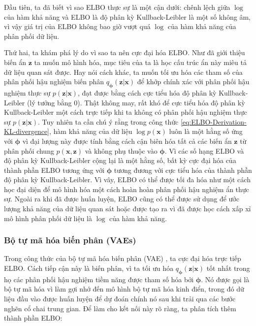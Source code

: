 \documentclass[14pt, a4paper]{article}
\numberwithin{equation}{section}
\numberwithin{figure}{section}
\numberwithin{dl}{section}
\numberwithin{md}{section}
\numberwithin{bd}{section}
\numberwithin{dn}{section}
\numberwithin{hq}{section}
\begin{document}
    Đầu tiên, ta đã biết vì sao ELBO thực sự là một cận dưới: chênh lệch giữa $\log$ của hàm khả năng và ELBO là độ phân kỳ Kullback-Leibler là một số không âm, vì vậy giá trị của ELBO không bao giờ vượt quá $\log$ của hàm khả năng của phân phối dữ liệu.

    Thứ hai, ta khám phá lý do vì sao ta nên cực đại hóa ELBO.
    Như đã giới thiệu biến ẩn $\boldsymbol{z}$ ta muốn mô hình hóa, mục tiêu của ta là học cấu trúc ẩn này miêu tả dữ liệu quan sát được.
    Hay nói cách khác, ta muốn tối ưu hóa các tham số của phân phối hậu nghiệm biến phân $q_{\boldsymbol{\phi}} (\boldsymbol{z} \vert \boldsymbol{x})$ để khớp chính xác với phân phối hậu nghiệm thực sự $p(\boldsymbol{z} \vert \boldsymbol{x})$, đạt được bằng cách cực tiểu hóa độ phân kỳ Kullback-Leibler (lý tưởng bằng 0).
    Thật không may, rất khó để cực tiểu hóa độ phân kỳ Kullback-Leibler một cách trực tiếp khi ta không có phân phối hậu nghiệm thực sự $p(\boldsymbol{z} \vert \boldsymbol{x})$.
    Tuy nhiên ta cần chú ý rằng trong công thức \ref{eq:ELBO-Derivation-KL-divergence}, hàm khả năng của dữ liệu $\log p(\boldsymbol{x})$ luôn là một hằng số ứng với $\boldsymbol{\phi}$ vì đại lượng này được tính bằng cách cận biên hóa tất cả các biến ẩn $\boldsymbol{z}$ từ phân phối chung $p(\boldsymbol{x}, \boldsymbol{z})$ và không phụ thuộc vào $\boldsymbol{\phi}$.
    Vì các số hạng ELBO và độ phân kỳ Kullback-Leibler cộng lại là một hằng số, bất kỳ cực đại hóa của thành phần ELBO tương ứng với $\boldsymbol{\phi}$ tương đương với cực tiểu hóa của thành phần độ phân kỳ Kullback-Leibler.
    Vì vây, ELBO có thể được tối đa hóa như một cách học đại diện để mô hình hóa một cách hoàn hoàn phân phối hậu nghiệm ẩn thực sự.
    Ngoài ra khi đã được huấn luyện, ELBO cũng có thể được sử dụng để ước lượng khả năng của dữ liệu quan sát hoặc được tạo ra vì đã được học cách xấp xỉ mô hình phân phối dữ liệu là $\log$ của hàm khả năng.

    \subsubsection{Bộ tự mã hóa biến phân (VAEs)}

    Trong công thức của bộ tự mã hóa biến phân (VAE) \cite{kingma2013auto}, ta cực đại hóa trực tiếp ELBO.
    Cách tiếp cận này là biến phân, vì ta tối ưu hóa $q_{\boldsymbol{\phi}} (\boldsymbol{z} \vert \boldsymbol{x})$ tốt nhất trong họ các phân phối hậu nghiệm tiềm năng được tham số hóa bởi $\boldsymbol{\phi}$.
    Nó được gọi là bộ tự mã hóa vì làm gợi nhớ đến mô hình bộ tự mã hóa kinh điển, trong đó dữ liệu đầu vào được huấn luyện để dự đoán chính nó sau khi trải qua các bước nghẽn cổ chai trung gian.
    Để làm cho kết nối này rõ ràng, ta phân tích thêm thành phần ELBO:
\end{document}
